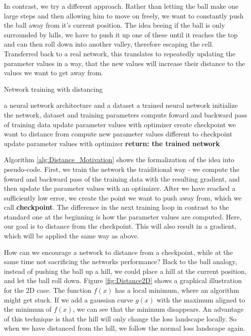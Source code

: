 In contrast, we try a different approach. Rather than letting the ball make one
large steps and then allowing him to move on freely, we want to constantly push
the ball away from it's current position. The idea beeing if the ball is only
surrounded by hills, we have to push it up one of these until it reaches the top
and can then roll down into another valley, therefore escaping the cell.
Transferred back to a real network, this translates to repeatedly updating the
parameter values in a way, that the new values will increase their distance to
the values we want to get away from.


\begin{algorithm}\label{alg:Distance_Motivation}
    \begin{algorithmic}[1]
        \caption{Network training with distancing}
        \REQUIRE a neural network architecture and a dataset
        \ENSURE a trained neural network
        \STATE initialize the network, dataset and training parameters
            \STATE compute foward and backward pass of training data
            \STATE update parameter values with optimizer
        \ENDFOR
        \STATE create checkpoint we want to distance from
            \STATE compute new parameter values different to checkpoint
            \STATE update parameter values with optimizer
        \ENDFOR
        \STATE \textbf{return: the trained network}
    \end{algorithmic}
\end{algorithm}

Algorithm \ref{alg:Distance_Motivation} shows the formalization of the idea into
pseudo-code. First, we train the network the traiditional way - we compute the
foward and backward pass of the training data with the resulting gradient, and
then update the parameter values with an optimizer. After we have reached a
sufficiently low error, we create the point we want to push away from, which we
call \textbf{checkpoint}. The difference in the next training loop in contrast
to the standard one at the beginning is how the parameter values are computed.
Here, our goal is to distance from the checkpoint. This will also result in a
gradient, which will be applied the same way as above.

How can we encourage a network to distance from a checkpoint, while at the same
time not sacrificing the networks performance? Back to the ball analogy, instead
of pushing the ball up a hill, we could place a hill at the current position,
and let the ball roll down. Figure \ref{fig:Distance2D} shows a graphical
illustration for the 2D case. The function $f(x)$ has a local minimum, where an
algorithm might get stuck. If we add a gaussian curve $g(x)$ with the maximum
aligned to the minimum of $f(x)$, we can see that the minimum disappears. An
advantage of this technique is that the hill will only change the loss landscape
locally. So when we have distanced from the hill, we follow the normal loss
landscape again.

